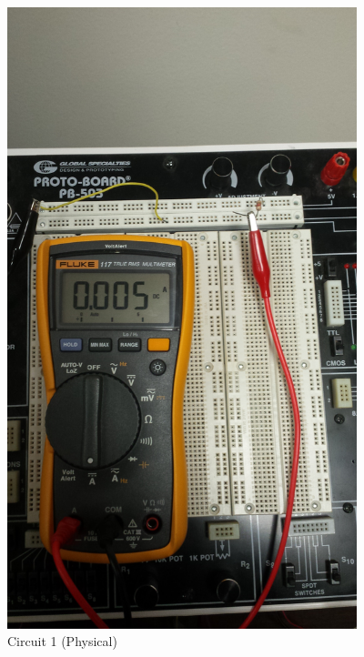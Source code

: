 \documentclass[12pt]{article}
\begin{document}
\begin{figure}[h!] %
   \centering
   \includegraphics[width=4in,angle=-90]{Circuit_1_real.jpg} 
   \caption{Circuit 1 (Physical)}
   \label{fig:example}
\end{figure}

\newpage
\end{document}
